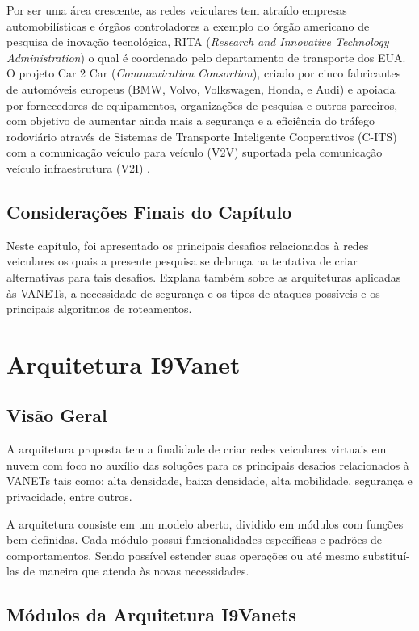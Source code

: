 \documentclass[
	12pt,				%
	oneside,			%
	a4paper,			%
	english,			%
	brazil				%
	]{abntex2ppgsi}
\begin{document}
Por ser uma área crescente, as redes veiculares tem atraído empresas automobilísticas e órgãos controladores  a exemplo do órgão americano de pesquisa de inovação tecnológica, RITA (\textit{Research and Innovative Technology Administration}) o qual é coordenado pelo departamento de transporte dos EUA. O projeto Car 2 Car (\textit{Communication Consortion}), criado por cinco fabricantes de automóveis europeus (BMW, Volvo, Volkswagen, Honda, e Audi) e apoiada por fornecedores de equipamentos, organizações de pesquisa e outros parceiros, com objetivo de aumentar ainda mais a segurança e a eficiência do tráfego rodoviário através de Sistemas de Transporte Inteligente Cooperativos (C-ITS) com a comunicação veículo para veículo (V2V) suportada pela comunicação veículo infraestrutura (V2I) . 

\section{Considerações Finais do Capítulo}
Neste capítulo, foi apresentado os principais desafios relacionados à redes veiculares os quais a presente pesquisa se debruça na tentativa de criar alternativas para tais desafios. Explana também sobre as arquiteturas aplicadas às VANETs, a necessidade de segurança e os tipos de ataques possíveis e os principais algoritmos de roteamentos.

\chapter{Arquitetura I9Vanet}\label{sec:i9vanet}

\section{Visão Geral}
A arquitetura proposta tem a finalidade de criar redes veiculares virtuais em nuvem com foco no auxílio das soluções para os principais desafios relacionados à VANETs tais como: alta densidade, baixa densidade, alta mobilidade, segurança e privacidade, entre outros. 

A arquitetura consiste em um modelo aberto, dividido em módulos com funções bem definidas. Cada módulo possui funcionalidades específicas e padrões de comportamentos. Sendo possível estender suas operações ou até mesmo substituí-las de maneira que atenda às novas necessidades.

\section{Módulos da Arquitetura I9Vanets}
\end{document}
